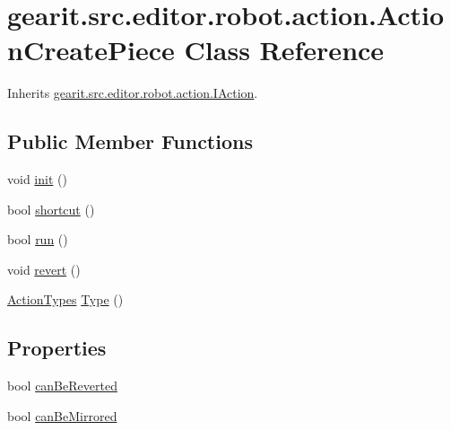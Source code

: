 \hypertarget{classgearit_1_1src_1_1editor_1_1robot_1_1action_1_1_action_create_piece}{\section{gearit.\+src.\+editor.\+robot.\+action.\+Action\+Create\+Piece Class Reference}
\label{classgearit_1_1src_1_1editor_1_1robot_1_1action_1_1_action_create_piece}
}


Inherits \hyperlink{interfacegearit_1_1src_1_1editor_1_1robot_1_1action_1_1_i_action}{gearit.\+src.\+editor.\+robot.\+action.\+I\+Action}.

\subsection*{Public Member Functions}
\begin{DoxyCompactItemize}
\item 
void \hyperlink{classgearit_1_1src_1_1editor_1_1robot_1_1action_1_1_action_create_piece_a56c01867f2aa4e45f915ca6ac02ba390}{init} ()
\item 
bool \hyperlink{classgearit_1_1src_1_1editor_1_1robot_1_1action_1_1_action_create_piece_a7f256cb25b401b0f4f652f1717d2b5c5}{shortcut} ()
\item 
bool \hyperlink{classgearit_1_1src_1_1editor_1_1robot_1_1action_1_1_action_create_piece_a8e9228d3d34513ed55bd87fe0bc7eab2}{run} ()
\item 
void \hyperlink{classgearit_1_1src_1_1editor_1_1robot_1_1action_1_1_action_create_piece_a1663c6d1d30d8a7917c55b752c95dd3d}{revert} ()
\item 
\hyperlink{namespacegearit_1_1src_1_1editor_1_1robot_1_1action_a4be0fd46e3952d6135136b20e7b3fc5e}{Action\+Types} \hyperlink{classgearit_1_1src_1_1editor_1_1robot_1_1action_1_1_action_create_piece_aac86115a23688551dae2e92cc9bdae8b}{Type} ()
\end{DoxyCompactItemize}
\subsection*{Properties}
\begin{DoxyCompactItemize}
\item 
bool \hyperlink{classgearit_1_1src_1_1editor_1_1robot_1_1action_1_1_action_create_piece_a6df51f74db21c39a64611ae16e240e19}{can\+Be\+Reverted}
\item 
bool \hyperlink{classgearit_1_1src_1_1editor_1_1robot_1_1action_1_1_action_create_piece_ad94cea6720d509bb34e310e152671e34}{can\+Be\+Mirrored}
\end{DoxyCompactItemize}


